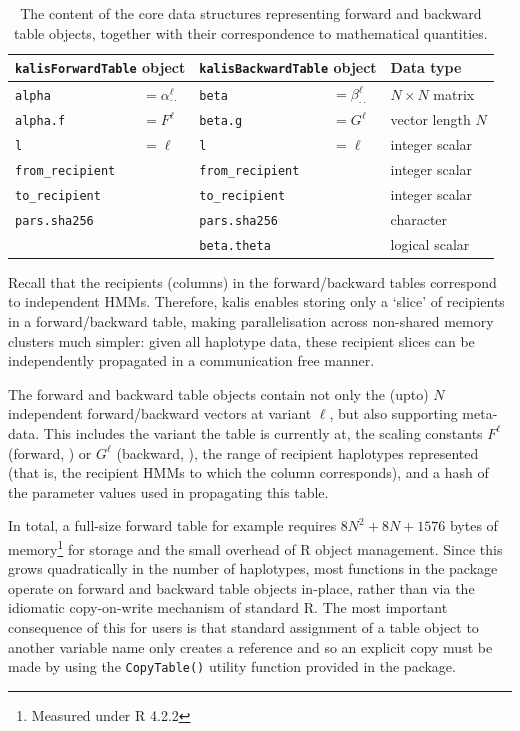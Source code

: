 \documentclass[pdflatex,referee,lineno,sn-nature]{sn-jnl}%
\let\proglang=\textsf
\newcommand{\pkg}[1]{{\fontseries{m}\fontseries{b}\selectfont #1}}
\begin{document}
\begin{table}[tbp]
	\centering
	\begin{tabular}{ll|ll|l}
		\hline
		\multicolumn{2}{l|}{\texttt{kalisForwardTable} object} &   \multicolumn{2}{l|}{\texttt{kalisBackwardTable} object} & Data type \\ \hline\hline
		\texttt{alpha} & $= \alpha^\ell_{\cdot\cdot}$ & \texttt{beta} & $= \beta^\ell_{\cdot\cdot}$  & $N   \times N$ matrix \\
		\texttt{alpha.f} & $= F^\ell$ & \texttt{beta.g} & $= G^\ell$ & vector length $N$ \\
		\texttt{l} & $= \ell$ & \texttt{l} & $= \ell$ & integer scalar \\
		\texttt{from\_recipient} & & \texttt{from\_recipient} & & integer scalar \\
		\texttt{to\_recipient} & & \texttt{to\_recipient} & & integer scalar \\
		\texttt{pars.sha256} & & \texttt{pars.sha256} & & character \\
		& & \texttt{beta.theta} & & logical scalar \\ \hline
	\end{tabular}
	\caption{The content of the core data structures representing forward and backward table objects, together with their correspondence to mathematical quantities.}
	\label{tab:fwdbck}
\end{table}

Recall that the recipients (columns) in the forward/backward tables correspond to independent HMMs.
Therefore, \pkg{kalis} enables storing only a `slice' of recipients in a forward/backward table, making parallelisation across non-shared memory clusters much simpler: given all haplotype data, these recipient slices can be independently propagated in a communication free manner.

The forward and backward table objects contain not only the (upto) \(N\) independent forward/backward vectors at variant \(\ell\), but also supporting meta-data.
This includes the variant the table is currently at, the scaling constants \(F^\ell\) (forward, ) or \(G^\ell\) (backward, ), the range of recipient haplotypes represented (that is, the recipient HMMs to which the column corresponds), and a hash of the parameter values used in propagating this table.

In total, a full-size forward table for example requires \(8N^2+8N+1576\) bytes of memory\footnote{Measured under \proglang{R} 4.2.2} for storage and the small overhead of \proglang{R} object management.
Since this grows quadratically in the number of haplotypes, most functions in the package operate on forward and backward table objects in-place, rather than via the idiomatic copy-on-write mechanism of standard \proglang{R}.
The most important consequence of this for users is that standard assignment of a table object to another variable name only creates a reference and so an explicit copy must be made by using the \texttt{CopyTable()} utility function provided in the package.
\end{document}
